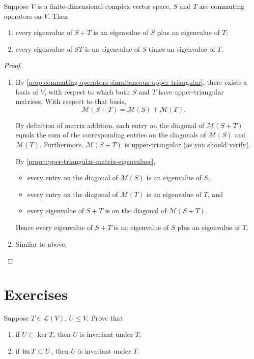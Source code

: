 \begin{proposition}
Suppose $V$ is a finite-dimensional complex vector space, $S$ and $T$ are commuting operators on $V$. Then
\begin{enumerate}[label=(\roman*)]
\item every eigenvalue of $S+T$ is an eigenvalue of $S$ plus an eigenvalue of $T$;
\item every eigenvalue of $ST$ is an eigenvalue of $S$ times an eigenvalue of $T$.
\end{enumerate}
\end{proposition}

\begin{proof} \
\begin{enumerate}[label=(\roman*)]
\item By \ref{prop:commuting-operators-simultaneous-upper-triangular}, there exists a basis of $V$, with respect to which both $S$ and $T$ have upper-triangular matrices.
With respect to that basis,
\[\mathcal{M}(S+T)=\mathcal{M}(S)+\mathcal{M}(T).\]

By definition of matrix addition, each entry on the diagonal of $\mathcal{M}(S+T)$ equals the sum of the corresponding entries on the diagonals of $\mathcal{M}(S)$ and $\mathcal{M}(T)$.
Furthermore, $\mathcal{M}(S+T)$ is upper-triangular (as you should verify).

By \ref{prop:upper-triangular-matrix-eigenvalues}, 
\begin{itemize}
\item every entry on the diagonal of $\mathcal{M}(S)$ is an eigenvalue of $S$,
\item every entry on the diagonal of $\mathcal{M}(T)$ is an eigenvalue of $T$, and
\item every eigenvalue of $S+T$ is on the diagonal of $\mathcal{M}(S+T)$.
\end{itemize}

Hence every eigenvalue of $S+T$ is an eigenvalue of $S$ plus an eigenvalue of $T$.

\item Similar to above.
\end{enumerate}
\end{proof}
\pagebreak

\section*{Exercises}
\begin{exercise}
Suppose $T\in\mathcal{L}(V)$, $U\le V$. Prove that
\begin{enumerate}[label=(\roman*)]
\item if $U\subset \ker T$, then $U$ is invariant under $T$;
\item if $\operatorname{im} T\subset U$, then $U$ is invariant under $T$.
\end{enumerate}
\end{exercise}

